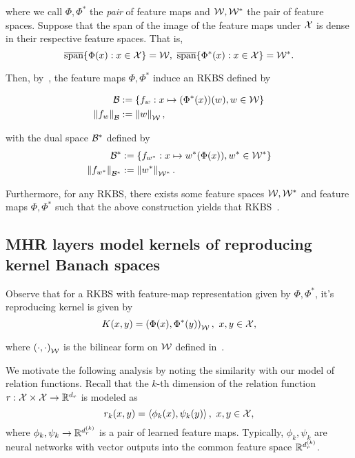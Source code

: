 \noindent where we call $\Phi, \Phi^*$ the \textit{pair} of feature maps and ${\mathcal{W}}, {\mathcal{W}}^*$ the pair of feature spaces. Suppose that the span of the image of the feature maps under ${\mathcal{X}}$ is dense in their respective feature spaces. That is,
\begin{equation}
    \overline{\text{span}}\{\Phi(x): x \in {\mathcal{X}}\} = {\mathcal{W}}, \ \overline{\text{span}}\{\Phi^*(x): x \in {\mathcal{X}}\} = {\mathcal{W}}^*.
\end{equation}

Then, by~\citep[Theorem 3]{zhangReproducingKernel2009}, the feature maps $\Phi, \Phi^*$ induce an RKBS defined by

\begin{align}
    {\mathcal{B}} &:= \left\{f_w: x \mapsto (\Phi^*(x))(w), w \in {\mathcal{W}}\right\} \\
    \left\lVert f_w\right\rVert_{\mathcal{B}} &:= \left\lVert w\right\rVert_{\mathcal{W}},
\end{align}

\noindent with the dual space ${\mathcal{B}}^*$ defined by
\begin{align}
    {\mathcal{B}}^* &:= \left\{f_{w^*}: x \mapsto w^*(\Phi(x)), w^* \in {\mathcal{W}}^*\right\} \\
    \left\lVert f_{w^*}\right\rVert_{{\mathcal{B}}^*} &:= \left\lVert w^*\right\rVert_{{\mathcal{W}}^*}.
\end{align}

Furthermore, for any RKBS, there exists some feature spaces ${\mathcal{W}}, {\mathcal{W}}^*$ and feature maps $\Phi, \Phi^*$ such that the above construction yields that RKBS~\citep[Theorem 4]{zhangReproducingKernel2009}.

\subsection{MHR layers model kernels of reproducing kernel Banach spaces}

Observe that for a RKBS with feature-map representation given by $\Phi, \Phi^*$, it's reproducing kernel is given by
\begin{equation}
    K(x, y) = \left(\Phi(x), \Phi^*(y)\right)_{{\mathcal{W}}}, \ x, y \in {\mathcal{X}},
\end{equation}

\noindent where $\left(\cdot, \cdot\right)_{{\mathcal{W}}}$ is the bilinear form on ${\mathcal{W}}$ defined in~.

We motivate the following analysis by noting the similarity with our model of relation functions. Recall that the $k$-th dimension of the relation function $r: {\mathcal{X}} \times {\mathcal{X}} \to \mathbb{R}^{d_r}$ is modeled as
\begin{equation}
    r_k(x, y) = \left \langle \phi_k(x), \psi_k(y) \right\rangle, \ x, y \in {\mathcal{X}},
\end{equation}
\noindent where $\phi_k, \psi_k \to \mathbb{R}^{d_r^{(k)}}$ is a pair of learned feature maps. Typically, $\phi_k, \psi_k$ are neural networks with vector outputs into the common feature space $\mathbb{R}^{d_r^{(k)}}$.

